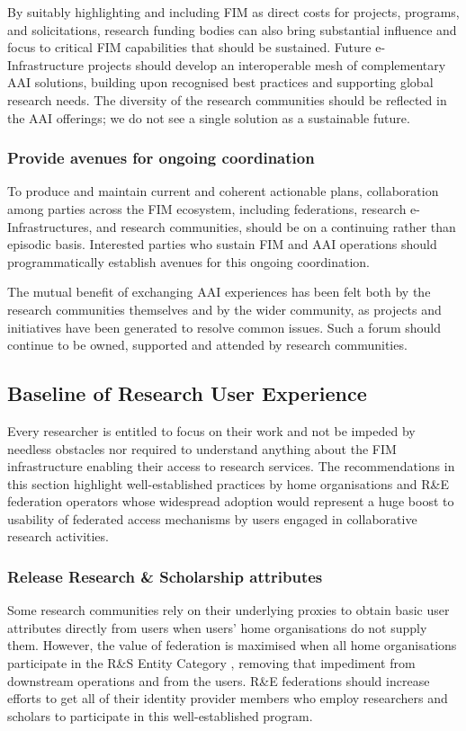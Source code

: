 \documentclass[fleqn,10pt]{wlscirep}
\begin{document}
{By suitably highlighting and including FIM as direct costs for projects, programs, and solicitations, research funding bodies can also bring substantial influence and focus to critical FIM capabilities that should be sustained.
Future e-Infrastructure projects should develop an interoperable mesh of complementary AAI solutions, building upon recognised best practices and supporting global research needs. The diversity of the research communities should be reflected in the AAI offerings; we do not see a single solution as a sustainable future. 
\subsubsection{Provide avenues for ongoing coordination} 
To produce and maintain current and coherent actionable plans, collaboration among parties across the FIM ecosystem, including federations, research e-Infrastructures, and research communities, should be on a continuing rather than episodic basis. Interested parties who sustain FIM and AAI operations should programmatically establish avenues for this ongoing coordination.

The mutual benefit of exchanging AAI experiences has been felt both by the research communities themselves and by the wider community, as projects and initiatives have been generated to resolve common issues. Such a forum should continue to be owned, supported and attended by research communities.  

\subsection{Baseline of Research User Experience}
Every researcher is entitled to focus on their work and not be impeded by needless obstacles nor required to understand anything about the FIM infrastructure enabling their access to research services. The recommendations in this section highlight well-established practices by home organisations and R\&E federation operators whose widespread adoption would represent a huge boost to usability of federated access mechanisms by users engaged in collaborative research activities. 

\subsubsection{Release Research \& Scholarship attributes}
Some research communities rely on their underlying proxies to obtain basic user attributes directly from users when users’ home organisations do not supply them. However, the value of federation is maximised when all home organisations participate in the R\&S Entity Category , removing that impediment from downstream operations and from the users. R\&E federations should increase efforts to get all of their identity provider members who employ researchers and scholars to participate in this well-established program.

}
\end{document}
